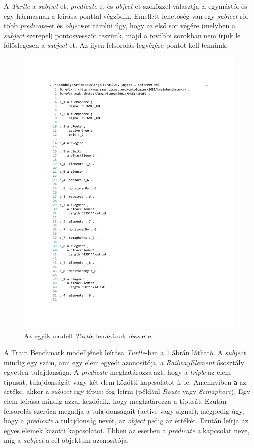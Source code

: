 A \emph{Turtle} a \emph{subject}-et, \emph{predicate}-et és \emph{object}-et szóközzel választja el egymástól és egy hármasnak a leírása ponttal végződik.\cite{Prud'hommeaux:14:RT} Emellett lehetőség van egy \emph{subject}-ről több \emph{predicate}-et és \emph{object}-et tárolni úgy, hogy az első sor végére (melyben a \emph{subject} szerepel) pontosvesszőt teszünk, majd a további sorokban nem írjuk le fölöslegesen a \emph{subject}-et. Az ilyen felsorolás legvégére pontot kell tennünk.
\begin{figure}[H]
	\centering
	\includegraphics{figures/Turtle.pdf}
	\caption{Az egyik modell \emph{Turtle} leírásának részlete.}
	\label{fig:Turtle}
\end{figure}

A Train Benchmark modelljének leírása \emph{Turtle}-ben a \ref{fig:Turtle} ábrán látható. A \emph{subject} mindig egy szám, ami egy elem egyedi azonosítója, a \emph{RailwayElement} ősosztály egyetlen tulajdonsága. A \emph{predicate} meghatározza azt, hogy a \emph{triple} az elem típusát, tulajdonságát vagy két elem közötti kapcsolatot ír le. Amennyiben \texttt{a} az értéke, akkor a \emph{subject} egy típust fog leírni (például \emph{Route} vagy \emph{Semaphore}). Egy elem leírása mindig azzal kezdődik, hogy meghatározza a típusát. Ezután felsorolás-szerűen megadja a tulajdonságait (active vagy signal), mégpedig úgy, hogy a \emph{predicate} a tulajdonság nevét, az \emph{object} pedig az értékét. Ezután leírja az egyes elemek közötti kapcsolatot. Ebben az esetben a \emph{predicate} a kapcsolat neve, míg a \emph{subject} a cél objektum azonosítója. 

